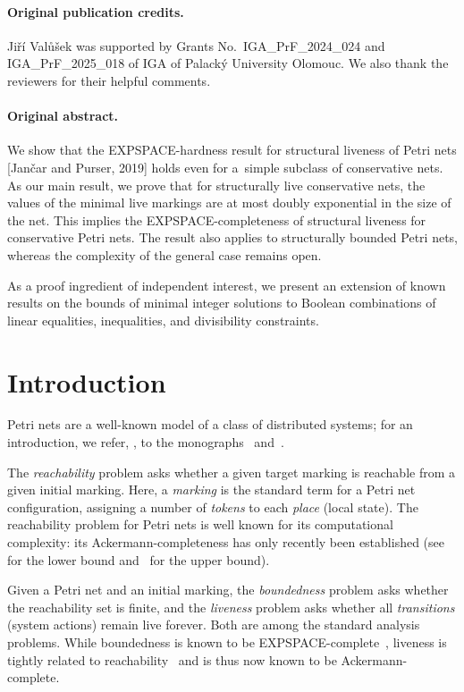 \paragraph{Original publication credits.} Ji\v{r}\'{i} Val\r{u}\v{s}ek was supported by
Grants No.\ IGA\_PrF\_2024\_024 and IGA\_PrF\_2025\_018 of IGA of Palack\'y University Olomouc.
We also thank the reviewers for their helpful comments.
\paragraph{Original abstract.} 
  \noindent We show that the EXPSPACE-hardness result for
	structural liveness of Petri nets [Jan\v{c}ar and
	Purser, 2019] holds even for a~simple subclass of
	conservative nets. As our main result, we prove that
	for structurally live conservative nets, the values of the
	minimal live markings are at most doubly exponential in the
	size of the net. This implies the EXPSPACE-completeness
	of structural liveness for conservative Petri nets. 
	The result also applies to structurally bounded Petri nets,
	whereas
the complexity of the general case remains open. 

As a proof ingredient of independent interest, we present an extension of known results on the bounds of minimal integer solutions to Boolean combinations of linear equalities, inequalities, and divisibility constraints.


\section{Introduction}


Petri nets are a well-known model of a class of distributed systems;
for an introduction, we refer, \eg, to the monographs~\cite{reisig2013} and~\cite{BestDevillers2024}.

The \emph{reachability} problem asks whether a given target marking is reachable from a given initial marking. Here, a \emph{marking} is the standard term for a Petri net configuration, assigning a number of \emph{tokens} to each \emph{place} (local state). The reachability problem for Petri nets is well known for its computational complexity: its Ackermann-completeness has only recently been established (see~\cite{DBLP:conf/focs/Leroux21,DBLP:conf/focs/CzerwinskiO21} for the lower bound and~\cite{DBLP:conf/lics/LerouxS19} for the upper bound).

Given a Petri net and an initial marking, the \emph{boundedness} problem asks whether the reachability set is finite, and the \emph{liveness} problem asks whether all \emph{transitions} (system actions) remain live forever. Both are among the standard analysis problems. While boundedness is known to be EXPSPACE-complete~\cite{DBLP:conf/stoc/CardozaLM76,DBLP:journals/tcs/Rackoff78}, liveness is tightly related to reachability~\cite{DBLP:conf/focs/Hack74} and is thus now known to be Ackermann-complete.



